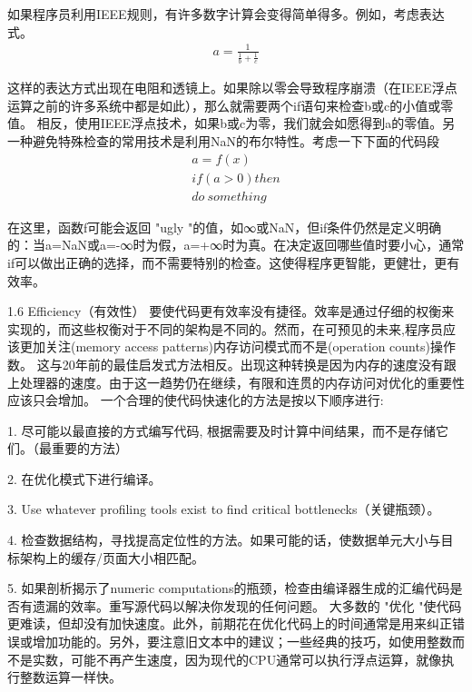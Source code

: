 如果程序员利用IEEE规则，有许多数字计算会变得简单得多。例如，考虑表达式。
\begin{equation}\label{key}
	\begin{aligned}	
		a=\frac{1}{\frac{1}{b}+\frac{1}{c}}
	\end{aligned}
\end{equation}

这样的表达方式出现在电阻和透镜上。如果除以零会导致程序崩溃（在IEEE浮点运算之前的许多系统中都是如此），那么就需要两个if语句来检查b或c的小值或零值。
相反，使用IEEE浮点技术，如果b或c为零，我们就会如愿得到a的零值。另一种避免特殊检查的常用技术是利用NaN的布尔特性。考虑一下下面的代码段
\begin{equation}\label{key}
	\begin{aligned}	
		a=f(x)\\
		if(a>0)then\\
		do \: something
	\end{aligned}
\end{equation}

在这里，函数f可能会返回 "ugly "的值，如∞或NaN，但if条件仍然是定义明确的：当a=NaN或a=-∞时为假，a=+∞时为真。在决定返回哪些值时要小心，通常if可以做出正确的选择，而不需要特别的检查。这使得程序更智能，更健壮，更有效率。


1.6 Efficiency（有效性）
要使代码更有效率没有捷径。效率是通过仔细的权衡来实现的，而这些权衡对于不同的架构是不同的。然而，在可预见的未来,程序员应该更加关注(memory access patterns)内存访问模式而不是(operation counts)操作数。
这与20年前的最佳启发式方法相反。出现这种转换是因为内存的速度没有跟上处理器的速度。由于这一趋势仍在继续，有限和连贯的内存访问对优化的重要性应该只会增加。
一个合理的使代码快速化的方法是按以下顺序进行: 

1.	尽可能以最直接的方式编写代码, 根据需要及时计算中间结果，而不是存储它们。（最重要的方法）

2.	在优化模式下进行编译。

3.	Use whatever profiling tools exist to find critical bottlenecks（关键瓶颈）。

4.	检查数据结构，寻找提高定位性的方法。如果可能的话，使数据单元大小与目标架构上的缓存/页面大小相匹配。

5.	如果剖析揭示了numeric computations的瓶颈，检查由编译器生成的汇编代码是否有遗漏的效率。重写源代码以解决你发现的任何问题。
大多数的 "优化 "使代码更难读，但却没有加快速度。此外，前期花在优化代码上的时间通常是用来纠正错误或增加功能的。另外，要注意旧文本中的建议；一些经典的技巧，如使用整数而不是实数，可能不再产生速度，因为现代的CPU通常可以执行浮点运算，就像执行整数运算一样快。

